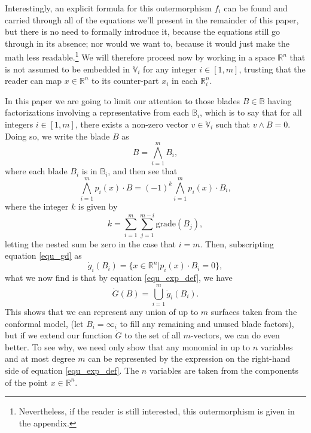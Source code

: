 \documentclass{birkjour}
\theoremstyle{definition}
\theoremstyle{remark}
\numberwithin{equation}{section}
\newcommand{\R}{\mathbb{R}}
\newcommand{\B}{\mathbb{B}}
\newcommand{\V}{\mathbb{V}}
\newcommand{\gd}{\dot{g}}
\newcommand{\Gd}{\dot{G}}
\newcommand{\nvai}{\infty}
\newcommand{\grade}{\mbox{grade}}
\begin{document}
Interestingly, an explicit formula for this outermorphism $f_i$ can be found and carried through
all of the equations we'll present in the remainder of this paper, but there is no need to
formally introduce it, because the equations still go through in its absence; nor would we want to,
because it would just make the math less readable.\footnote{Nevertheless,
if the reader is still
interested, this outermorphism is given in the appendix.}  We will therefore
proceed now by working in a space $\R^n$ that is not assumed to be
embedded in $\V_i$ for any integer $i\in[1,m]$, trusting that the
reader can map $x\in\R^n$ to its counter-part $x_i$ in each $\R_i^n$.

In this paper we are going to limit our attention
to those blades $B\in\B$ having factorizations involving a representative from each $\B_i$,
which is to say that for all integers $i\in[1,m]$, there exists a non-zero vector $v\in\V_i$ such that $v\wedge B=0$.
Doing so, we write the blade $B$ as
\begin{equation}\label{equ_B_factored}
B = \bigwedge_{i=1}^m B_i,
\end{equation}
where each blade $B_i$ is in $\B_i$, and then see that
\begin{equation}\label{equ_exp_def}
\bigwedge_{i=1}^m p_i(x)\cdot B = (-1)^k\bigwedge_{i=1}^m p_i(x)\cdot B_i,
\end{equation}
where the integer $k$ is given by
\begin{equation}\label{equ_k}
k=\sum_{i=1}^m\sum_{j=1}^{m-i}\grade(B_j),
\end{equation}
letting the nested sum be zero in the case that $i=m$.
Then, subscripting equation \eqref{equ_gd} as
\begin{equation*}
\gd_i(B_i) = \{x\in\R^n|p_i(x)\cdot B_i=0\},
\end{equation*}
what we now find is that by equation \eqref{equ_exp_def}, we have
\begin{equation*}
\Gd(B) = \bigcup_{i=1}^m\gd_i(B_i).
\end{equation*}
This shows that we can represent any union of up to $m$ surfaces taken from the conformal model,
(let $B_i=\nvai_i$ to fill any remaining and unused blade factors),
but if we extend our function $\Gd$ to the set of all $m$-vectors, we can do even better.
To see why, we need only show that any monomial in up to $n$ variables and at most
degree $m$ can be represented by the expression on the right-hand side of equation \eqref{equ_exp_def}.
The $n$ variables are taken from the components of the point $x\in\R^n$.
\end{document}
